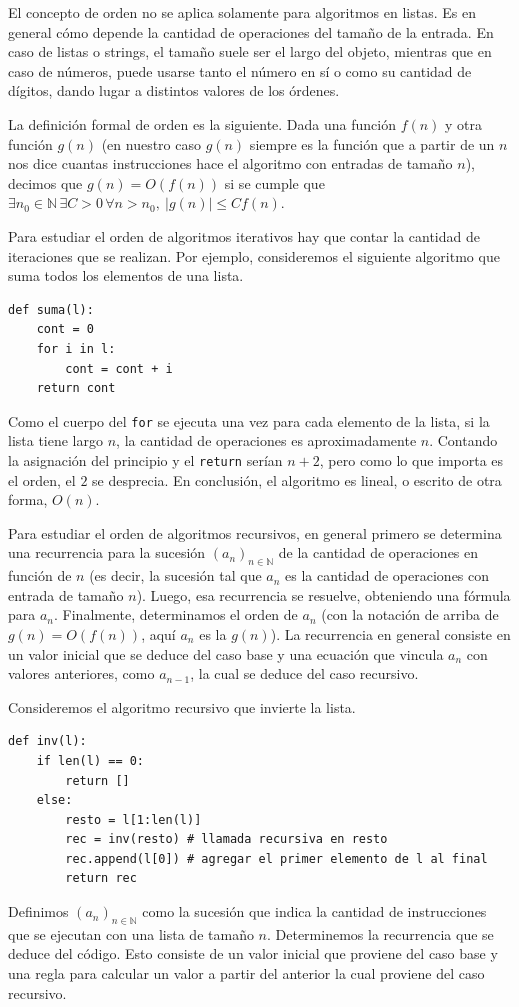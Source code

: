 \documentclass[a4paper, 12pt]{report}
\newcommand{\N}{\mathbb{N}}
\theoremstyle{definition}
\begin{document}
El concepto de orden no se aplica solamente para algoritmos en listas. Es en general cómo depende la cantidad de operaciones del tamaño de la entrada. En caso de listas o strings, el tamaño suele ser el largo del objeto, mientras que en caso de números, puede usarse tanto el número en sí o como su cantidad de dígitos, dando lugar a distintos valores de los órdenes.

La definición formal de orden es la siguiente. Dada una función $f(n)$ y otra función $g(n)$ (en nuestro caso $g(n)$ siempre es la función que a partir de un $n$ nos dice cuantas instrucciones hace el algoritmo con entradas de tamaño $n$), decimos que $g(n) = O(f(n))$ si se cumple que $\exists n_0\in\N\,\exists C>0\,\forall n > n_0,~|g(n)| \leq Cf(n)$.

Para estudiar el orden de algoritmos iterativos hay que contar la cantidad de iteraciones que se realizan. Por ejemplo, consideremos el siguiente algoritmo que suma todos los elementos de una lista.
\begin{verbatim}
def suma(l):
    cont = 0
    for i in l:
        cont = cont + i
    return cont
\end{verbatim}
Como el cuerpo del {\tt for} se ejecuta una vez para cada elemento de la lista, si la lista tiene largo $n$, la cantidad de operaciones es aproximadamente $n$. Contando la asignación del principio y el {\tt return} serían $n+2$, pero como lo que importa es el orden, el $2$ se desprecia. En conclusión, el algoritmo es lineal, o escrito de otra forma, $O(n)$.

Para estudiar el orden de algoritmos recursivos, en general primero se determina una recurrencia para la sucesión $(a_n)_{n\in\N}$ de la cantidad de operaciones en función de $n$ (es decir, la sucesión tal que $a_n$ es la cantidad de operaciones con entrada de tamaño $n$). Luego, esa recurrencia se resuelve, obteniendo una fórmula para $a_n$. Finalmente, determinamos el orden de $a_n$ (con la notación de arriba de $g(n)=O(f(n))$, aquí $a_n$ es la $g(n)$). La recurrencia en general consiste en un valor inicial que se deduce del caso base y una ecuación que vincula $a_n$ con valores anteriores, como $a_{n-1}$, la cual se deduce del caso recursivo.

Consideremos el algoritmo recursivo que invierte la lista.
\begin{verbatim}
def inv(l):
    if len(l) == 0:
        return []
    else:
        resto = l[1:len(l)]
        rec = inv(resto) # llamada recursiva en resto
        rec.append(l[0]) # agregar el primer elemento de l al final
        return rec
\end{verbatim}
Definimos $(a_n)_{n\in \N}$ como la sucesión que indica la cantidad de instrucciones que se ejecutan con una lista de tamaño $n$. Determinemos la recurrencia que se deduce del código. Esto consiste de un valor inicial que proviene del caso base y una regla para calcular un valor a partir del anterior la cual proviene del caso recursivo.
\end{document}
